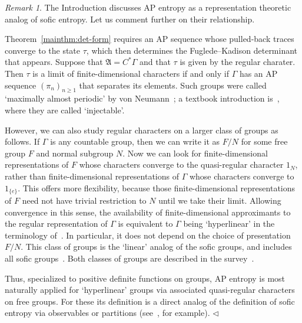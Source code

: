 \documentclass[12pt,a4paper]{article}
\numberwithin{equation}{section}
\theoremstyle{remark}
\newtheorem{rmk}[thm]{Remark}
\newcommand{\A}{\mathfrak{A}}
\newcommand{\G}{\Gamma}
\newcommand{\fin}{\nolinebreak\hspace{\stretch{1}}$\lhd$}
\begin{document}
\begin{rmk}
The Introduction discusses AP entropy as a representation theoretic analog of sofic entropy.  Let us comment further on their relationship.

Theorem~\ref{mainthm:det-form} requires an AP sequence whose pulled-back traces converge to the state $\tau$, which then determines the Fuglede--Kadison determinant that appears.  Suppose that $\A = C^\ast \G$ and that $\tau$ is given by the regular charater.  Then $\tau$ is a limit of finite-dimensional characters if and only if $\G$ has an AP sequence $(\pi_n)_{n\ge 1}$ that separates its elements.  Such groups were called `maximally almost periodic' by von Neumann~\cite{vonNeu34}; a textbook introduction is~\cite[Secs. 16.4--5]{Dix--Cstar}, where they are called `injectable'. %

However, we can also study regular characters on a larger class of groups as follows.  If $\G$ is any countable group, then we can write it as $F/N$ for some free group $F$ and normal subgroup $N$. Now we can look for finite-dimensional representations of $F$ whose characters converge to the quasi-regular character $1_N$, rather than finite-dimensional representations of $\G$ whose characters converge to $1_{\{e\}}$.  This offers more flexibility, because those finite-dimensional representations of $F$ need not have trivial restriction to $N$ until we take their limit.  Allowing convergence in this sense, the availability of finite-dimensional approximants to the regular representation of $\G$ is equivalent to $\G$ being `hyperlinear' in the terminology of~\cite{Rad08}.  In particular, it does not depend on the choice of presentation $F/N$.  This class of groups is the `linear' analog of the sofic groups, and includes all sofic groups~\cite{EleSza05}.  Both classes of groups are described in the survey~\cite{KwiPes13}. %

Thus, specialized to positive definite functions on groups, AP entropy is most naturally applied for `hyperlinear' groups via associated quasi-regular characters on free groups.  For these its definition is a direct analog of the definition of sofic entropy via observables or partitions (see~\cite[Def. 5]{Bowen--survey}, for example). \fin
\end{rmk}
\end{document}
